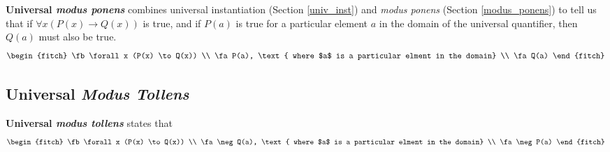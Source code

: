 \textbf{Universal \emph{modus ponens}} combines universal instantiation
(Section \ref{univ_inst}) and \emph{modus ponens} (Section \ref{modus_ponens}) to
tell us that if $\forall x (P(x) \to Q(x) )$ is true, and if $P(a)$ is true for a
particular element $a$ in the domain of the universal quantifier, then $Q(a)$ must
also be true.
\begin{equation}
  \begin{fitch}
    \fb \forall x (P(x) \to Q(x)) \\
    \fa P(a), \text{ where $a$ is a particular elment in the domain} \\
    \fa Q(a)
  \end{fitch}
  \label{eq:univ_mod_pon}
\end{equation}

\subsection{Universal \emph{Modus Tollens}}

\textbf{Universal \emph{modus tollens}} states that
\begin{equation}
  \begin{fitch}
    \fb \forall x (P(x) \to Q(x)) \\
    \fa \neg Q(a), \text{ where $a$ is a particular elment in the domain} \\
    \fa \neg P(a)
  \end{fitch}
  \label{eq:univ_mod_tol}
\end{equation}

